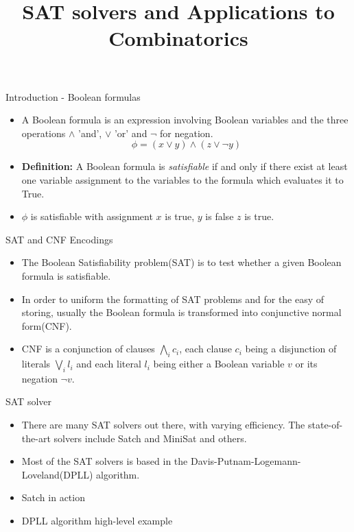 \documentclass{beamer}
\title{SAT solvers and Applications to Combinatorics }
\date{}
\begin{document}
\begin{frame}[plain]
    \maketitle
\end{frame}

\begin{frame}{Introduction - Boolean formulas}
	\begin{itemize}
		\item A Boolean formula is an expression involving Boolean variables and the three operations $\wedge$ 'and', $\vee$ 'or' and  $\neg$ for negation.
		$$\phi = (x\vee y) \wedge (z \vee \neg y)$$
		\item \textbf{Definition:} A Boolean formula is \textit{satisfiable} if and only if there exist at least one variable assignment to the variables to the formula which evaluates it to True. 
		\item $\phi$ is satisfiable with assignment $x$ is true, $y$ is false $z$ is true. 
	\end{itemize}
\end{frame}

\begin{frame}{SAT and CNF Encodings}

	\begin{itemize}
		\item The Boolean Satisfiability problem(SAT) is to test whether a given Boolean formula is satisfiable.
		\item In order to uniform the formatting of SAT problems and for the easy of storing, usually the Boolean formula is transformed into conjunctive normal form(CNF).
		\item CNF is a conjunction of clauses $\bigwedge_{i} c_i$, each clause $c_i$ being a disjunction of literals $\bigvee_i l_i$ and each literal $l_i$ being either a Boolean variable $v$ or its negation $\neg v$. 
	\end{itemize}
\end{frame}

\begin{frame}{SAT solver}

	\begin{itemize}
		\item There are many SAT solvers out there, with varying efficiency. The state-of-the-art solvers include Satch and MiniSat and others. 
		\item Most of the SAT solvers is based in the Davis-Putnam-Logemann-Loveland(DPLL) algorithm.
		\item Satch in action
		\item DPLL algorithm high-level example
	\end{itemize}
\end{frame}
\end{document}
